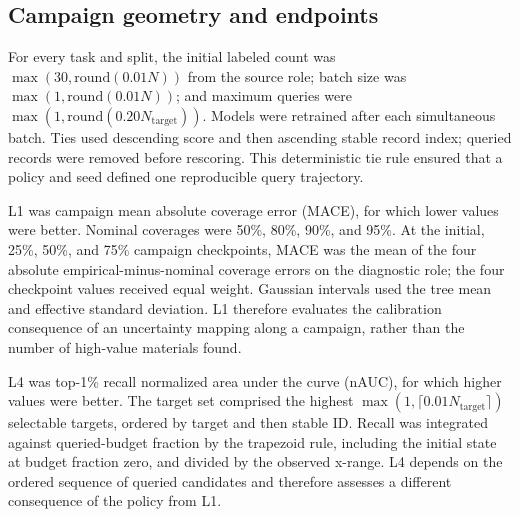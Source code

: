 \documentclass[10pt]{article}
\begin{document}
\subsection{Campaign geometry and endpoints}
For every task and split, the initial labeled count was
$\max(30,\mathrm{round}(0.01N))$ from the source role; batch size was
$\max(1,\mathrm{round}(0.01N))$; and maximum queries were
$\max(1,\mathrm{round}(0.20N_{\mathrm{target}}))$. Models were retrained after
each simultaneous batch. Ties used descending score and then ascending stable
record index; queried records were removed before rescoring. This deterministic
tie rule ensured that a policy and seed defined one reproducible query
trajectory.

L1 was campaign mean absolute coverage error (MACE), for which lower values
were better. Nominal coverages were 50\%, 80\%, 90\%, and 95\%. At the
initial, 25\%, 50\%, and 75\% campaign checkpoints, MACE was the mean of the
four absolute empirical-minus-nominal coverage errors on the diagnostic role;
the four checkpoint values received equal weight. Gaussian intervals used the
tree mean and effective standard deviation. L1 therefore evaluates the
calibration consequence of an uncertainty mapping along a campaign, rather
than the number of high-value materials found.

L4 was top-1\% recall normalized area under the curve (nAUC), for which higher
values were better. The target set comprised the highest
$\max(1,\lceil0.01N_{\mathrm{target}}\rceil)$ selectable targets, ordered by
target and then stable ID. Recall was integrated against queried-budget
fraction by the trapezoid rule, including the initial state at budget fraction
zero, and divided by the observed x-range. L4 depends on the ordered sequence
of queried candidates and therefore assesses a different consequence of the
policy from L1.
\end{document}
